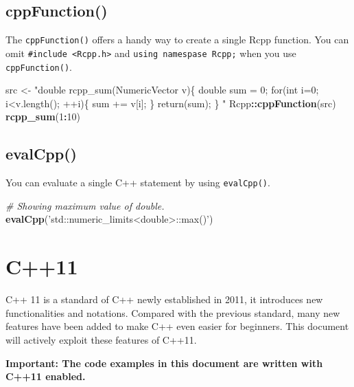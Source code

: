 \documentclass[
]{book}
\newenvironment{Shaded}{\begin{snugshade}}{\end{snugshade}}
\newcommand{\CommentTok}[1]{\textcolor[rgb]{0.56,0.35,0.01}{\textit{#1}}}
\newcommand{\DecValTok}[1]{\textcolor[rgb]{0.00,0.00,0.81}{#1}}
\newcommand{\KeywordTok}[1]{\textcolor[rgb]{0.13,0.29,0.53}{\textbf{#1}}}
\newcommand{\NormalTok}[1]{#1}
\newcommand{\OperatorTok}[1]{\textcolor[rgb]{0.81,0.36,0.00}{\textbf{#1}}}
\newcommand{\StringTok}[1]{\textcolor[rgb]{0.31,0.60,0.02}{#1}}
\begin{document}
\hypertarget{cppfunction}{%
\section{cppFunction()}\label{cppfunction}}

The \texttt{cppFunction()} offers a handy way to create a single Rcpp function. You can omit \texttt{\#include\ \textless{}Rcpp.h\textgreater{}} and \texttt{using\ namespase\ Rcpp;} when you use \texttt{cppFunction()}.

\begin{Shaded}
\begin{Highlighting}[]
\NormalTok{src <-}
\StringTok{  "double rcpp_sum(NumericVector v)\{}
\StringTok{    double sum = 0;}
\StringTok{    for(int i=0; i<v.length(); ++i)\{}
\StringTok{      sum += v[i];}
\StringTok{    \}}
\StringTok{    return(sum);}
\StringTok{  \}}
\StringTok{  "}
\NormalTok{Rcpp}\OperatorTok{::}\KeywordTok{cppFunction}\NormalTok{(src)}
\KeywordTok{rcpp_sum}\NormalTok{(}\DecValTok{1}\OperatorTok{:}\DecValTok{10}\NormalTok{)}
\end{Highlighting}
\end{Shaded}

\hypertarget{evalcpp}{%
\section{evalCpp()}\label{evalcpp}}

You can evaluate a single C++ statement by using \texttt{evalCpp()}.

\begin{Shaded}
\begin{Highlighting}[]
\CommentTok{# Showing maximum value of double.}
\KeywordTok{evalCpp}\NormalTok{(}\StringTok{'std::numeric_limits<double>::max()'}\NormalTok{)}
\end{Highlighting}
\end{Shaded}

\hypertarget{c11}{%
\chapter{C++11}\label{c11}}

C++ 11 is a standard of C++ newly established in 2011, it introduces new functionalities and notations. Compared with the previous standard, many new features have been added to make C++ even easier for beginners. This document will actively exploit these features of C++11.

\textbf{Important: The code examples in this document are written with C++11 enabled.}
\end{document}
